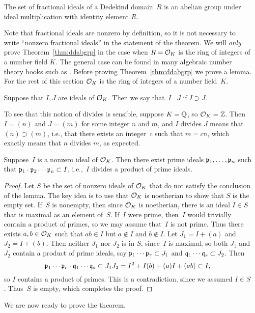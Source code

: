 \begin{theorem}\label{thm:ddabgrp}
The set of fractional ideals of a Dedekind domain~$R$ is an
abelian group under ideal multiplication with identity element $R$.
\end{theorem}
Note that fractional ideals are nonzero by definition, so it is not
necessary to write ``nonzero fractional ideals'' in the statement of
the theorem. We will {\em only} prove Theorem~\ref{thm:ddabgrp} in the
case when $R=\mathcal{O}_K$ is the ring of integers of a number field $K$. The
general case can be found in many algebraic number theory books such
as \cite[Ch.~3]{marcus1977number}.
Before proving Theorem~\ref{thm:ddabgrp} we prove a lemma.  For the
rest of this section $\mathcal{O}_K$ is the ring of integers of a number
field~$K$.


\begin{definition}
Suppose that $I,J$ are ideals of $\mathcal{O}_K$.
Then we say that~$I$ ~$J$ if $I\supset J$.
\end{definition}
To see that this notion of divides is sensible, suppose $K=\mathbb{Q}$, so
$\mathcal{O}_K=\mathbb{Z}$.  Then $I=(n)$ and $J=(m)$ for some integer $n$ and $m$, and
$I$ divides $J$ means that $(n)\supset (m)$, i.e., that there exists
an integer~$c$ such that $m=cn$, which exactly means that $n$ divides
$m$, as expected.

\begin{lemma}\label{lem:divprod}
Suppose~$I$ is a nonzero ideal of $\mathcal{O}_K$.  Then there exist prime ideals
$\mathfrak{p}_1,\ldots, \mathfrak{p}_n$ such that $\mathfrak{p}_1\cdot \mathfrak{p}_2\cdots \mathfrak{p}_n \subset{}I$,
i.e.,~$I$ divides a product of prime ideals.
\end{lemma}
\begin{proof}
Let $S$ be the set of nonzero ideals of $\mathcal{O}_K$ that do not
satisfy the conclusion
of the lemma.  The key idea is to use that $\mathcal{O}_K$ is noetherian to show that
$S$ is the empty set.   If~$S$ is
nonempty, then since $\mathcal{O}_K$ is noetherian, there is an ideal
$I\in S$ that is maximal as an element of~$S$.  If~$I$ were prime, then~$I$
would trivially contain a product of primes, so we may assume that~$I$
is not prime.  Thus there exists $a,b\in \mathcal{O}_K$ such that $ab\in
I$ but $a\not\in I$ and $b\not\in I$.  Let $J_1 = I+(a)$ and
$J_2=I+(b)$.  Then neither $J_1$ nor $J_2$ is in $S$, since~$I$ is
maximal, so both $J_1$ and $J_2$ contain a product of prime ideals,
say $\mathfrak{p}_1 \cdots \mathfrak{p}_r \subset J_1$ and $\mathfrak{q}_1\cdots \mathfrak{q}_s \subset J_2$.
Then
$$
\mathfrak{p}_1  \cdots \mathfrak{p}_r \cdot \mathfrak{q}_1\cdots \mathfrak{q}_s \subset
J_1 J_2 = I^2 + I(b)+  (a)I+ (ab) \subset I,$$
so $I$ contains a product of primes.  This is a contradiction,
since we assumed $I\in S$.   Thus~$S$ is empty, which completes
the proof.
\end{proof}
We are now ready to prove the theorem.

